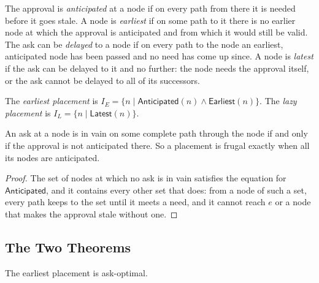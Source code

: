 \documentclass[acmsmall,nonacm,screen]{acmart}
\newcommand{\kw}[1]{\mathsf{#1}}
\newcommand{\Ant}{\kw{Anticipated}}
\newcommand{\Earliest}{\kw{Earliest}}
\newcommand{\Latest}{\kw{Latest}}
\begin{document}
The approval is \emph{anticipated} at a node if on every path from there it is needed
before it goes stale. A node is \emph{earliest} if on some path to it there is no earlier
node at which the approval is anticipated and from which it would still be valid. The ask
can be \emph{delayed} to a node if on every path to the node an earliest, anticipated node
has been passed and no need has come up since. A node is \emph{latest} if the ask can be
delayed to it and no further: the node needs the approval itself, or the ask cannot be
delayed to all of its successors.

\begin{definition}
\label{def:placements}
The \emph{earliest placement} is $I_E = \{n \mid \Ant(n) \land \Earliest(n)\}$. The
\emph{lazy placement} is $I_L = \{n \mid \Latest(n)\}$.
\end{definition}

\begin{lemma}
\label{lem:anticipated}
An ask at a node is in vain on some complete path through the node if and only if the
approval is not anticipated there. So a placement is frugal exactly when all its nodes are
anticipated.
\end{lemma}

\begin{proof}
The set of nodes at which no ask is in vain satisfies the equation for $\Ant$, and it
contains every other set that does: from a node of such a set, every path keeps to the set
until it meets a need, and it cannot reach $e$ or a node that makes the approval stale
without one.
\end{proof}

\subsection{The Two Theorems}

\begin{theorem}
\label{thm:earliest}
The earliest placement is ask-optimal.
\end{theorem}
\end{document}
